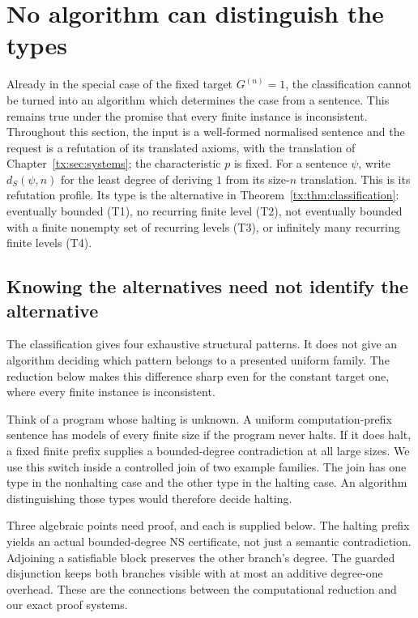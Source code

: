 \chapter{No algorithm can distinguish the types}\label{tx:sec:undecidability}
Already in the special case of the fixed target $G^{(n)}=1$, the
classification cannot be turned into an algorithm
which determines the case from a sentence. This remains true under the
promise that every finite instance is inconsistent. Throughout this section,
the input is a well-formed normalised sentence and the request is a
refutation of its translated axioms, with the translation of
Chapter~\ref{tx:sec:systems}; the characteristic $p$ is fixed.
For a sentence $\psi$, write $d_S(\psi,n)$ for the least degree of
deriving $1$ from its size-$n$ translation. This is its refutation
profile. Its type is the alternative in Theorem~\ref{tx:thm:classification}:
eventually bounded (T1), no recurring finite level (T2), not eventually bounded with
a finite nonempty set of recurring levels (T3), or infinitely many
recurring finite levels (T4).

\section{Knowing the alternatives need not identify the alternative}
The classification gives four exhaustive structural patterns. It does
not give an algorithm deciding which pattern belongs to a presented
uniform family. The reduction below makes this difference sharp even
for the constant target one, where every finite instance is inconsistent.

Think of a program whose halting is unknown. A uniform computation-prefix
sentence has models of every finite size if the program never halts.
If it does halt, a fixed finite prefix supplies a bounded-degree
contradiction at all large sizes. We use this switch inside a controlled
join of two example families. The join has one type in the nonhalting
case and the other type in the halting case. An algorithm distinguishing
those types would therefore decide halting.

Three algebraic points need proof, and each is supplied below. The
halting prefix yields an actual bounded-degree NS certificate, not just
a semantic contradiction. Adjoining a satisfiable block preserves the
other branch's degree. The guarded disjunction keeps both branches
visible with at most an additive degree-one overhead. These are the
connections between the computational reduction and our exact proof
systems.

